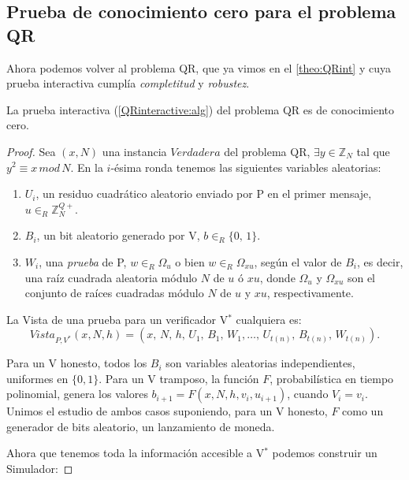 \subsection{Prueba de conocimiento cero para el problema QR}

Ahora podemos volver al problema QR, que ya vimos en el \autoref{theo:QRint} y cuya prueba interactiva cumplía \textit{completitud} y \textit{robustez}.

\begin{theorem}
	La prueba interactiva (\ref{QRinteractive:alg}) del problema QR es de conocimiento cero.
\end{theorem}

\begin{proof}
	Sea $(x,N)$ una instancia $Verdadera$ del problema QR, $\exists y\in \mathbb{Z}_N$ tal que $y^2\equiv x \, mod \, N$. En la $i$-ésima ronda tenemos las siguientes variables aleatorias:
	
	\begin{enumerate}
		\item $U_i$, un residuo cuadrático aleatorio enviado por P en el primer mensaje, $u \in_R \mathbb{Z}^{Q+}_N$.
		
		\item $B_i$, un bit aleatorio generado por V, $b \in_R \{0,\,1\}$.
		
		\item $W_i$, una \textit{prueba} de P, $w \in_R \Omega_u$ o bien $w \in_R \Omega_{xu}$, según el valor de $B_i$, es decir, una raíz cuadrada aleatoria módulo $N$ de $u$ ó $xu$, donde $\Omega_u$ y $ \Omega_{xu}$ son el conjunto de raíces cuadradas módulo $N$ de $u$ y $xu$, respectivamente.
	\end{enumerate}
	
	
	La Vista de una prueba para un verificador V$^*$ cualquiera es:
	\[Vista_{P,V^*}(x,N,h) = (x,\,N,\,h,\,U_1,\,B_1,\,W_1, \dots ,\,U_{t(n)},\,B_{t(n)},\,W_{t(n)}).\]
	
	
	Para un V honesto, todos los $B_i$ son variables aleatorias independientes, uniformes en $\{0,1\}$. Para un V tramposo, la función $F$, probabilística en tiempo polinomial, genera los valores $b_{i+1} = F(x,N,h,v_i,u_{i+1})$, cuando $V_i = v_i$. Unimos el estudio de ambos casos suponiendo, para un V honesto, $F$ como un generador de bits aleatorio, un lanzamiento de moneda.
	
	Ahora que tenemos toda la información accesible a V$^*$ podemos construir un Simulador:
	

\end{proof}
